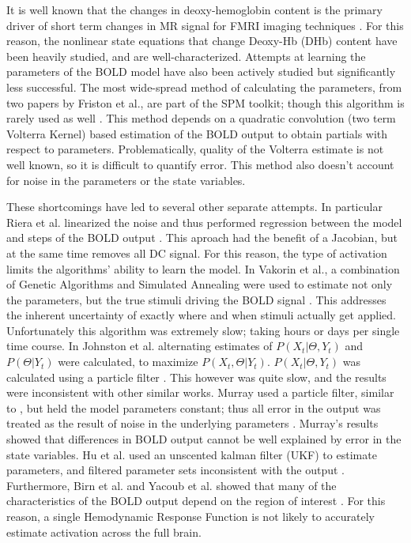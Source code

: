\documentclass[journal]{./IEEEtran}
\begin{document}
It is well known that the changes in deoxy-hemoglobin content is the
primary driver of short term changes in MR signal for FMRI imaging
techniques \cite{Buxton1998, WEISSKOFF1994, Ogawa, Obata2004}. For
this reason, the nonlinear state equations that change Deoxy-Hb (DHb) 
content have been heavily studied, and are well-characterized. Attempts
at learning the parameters of the BOLD model have also been actively
studied but significantly less successful. The most wide-spread method
of calculating the parameters, from two papers by Friston et al., 
are part of the SPM toolkit; though this algorithm is rarely used 
as well \cite{Friston2000, Friston2002b}. 
This method depends on a quadratic convolution (two term Volterra Kernel)
based estimation of the BOLD output to obtain partials with respect 
to parameters. Problematically, quality of the Volterra estimate
is not well known, so it is difficult to quantify error. This method 
also doesn't account for noise in the parameters or the state variables.

These shortcomings have led to several other separate attempts. In particular 
Riera et al. linearized the noise and thus performed regression between
the model and steps of the BOLD output \cite{Riera2003}. This aproach
had the benefit of a Jacobian,  but at the same time removes all DC 
signal. For this reason, the type of activation limits the
algorithms' ability to learn the model.
In Vakorin et al., a combination of Genetic Algorithms and Simulated 
Annealing were used to estimate not only the parameters, but the 
true stimuli driving the BOLD signal \cite{Vakorin2007}. 
This addresses the inherent uncertainty of exactly where and when 
stimuli actually get applied. Unfortunately this algorithm was extremely
slow; taking hours or days per single time course.
In Johnston et al. alternating estimates of $P(X_t | \Theta, Y_t)$ and 
$P(\Theta | Y_t)$ were calculated, to maximize $P(X_t, \Theta | Y_t)$. 
$P(X_t | \Theta, Y_t)$ was calculated using a particle filter 
\cite{Johnston2008}. This however was quite slow, and the results
were inconsistent with other similar works. 
Murray used a particle filter, similar to \cite{Johnston2008}, but
held the model parameters constant; thus all error in the output
was treated as the result of noise in the underlying parameters 
\cite{Murray2008}. Murray's results showed that differences in
BOLD output cannot be well explained by error in the state variables.
Hu et al. used an unscented kalman filter (UKF) to estimate parameters,
and filtered parameter sets inconsistent with the output  \cite{Hu2009}.
 Furthermore, Birn et al. and Yacoub et al. showed that many
of the characteristics of the BOLD output depend on the region 
of interest \cite{Birn2001, Yacoub2006}. For this reason, a single
Hemodynamic Response Function is not likely to accurately estimate
activation across the full brain. 
\end{document}
